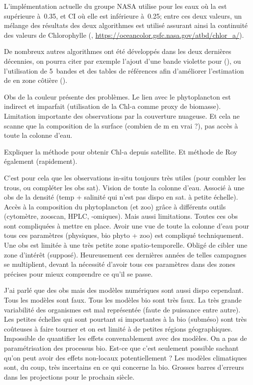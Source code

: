 L'implémentation actuelle du groupe NASA  utilise  pour les eaux où la  est supérieure à~\qty{0.35}{\mgm}, et CI où elle est inférieure à~\qty{0.25}{\mgm}; entre ces deux valeurs, un mélange des résultats des deux algorithmes est utilisé assurant ainsi la continuité des valeurs de Chlorophylle (\cite{oreilly_2019}, \url{https://oceancolor.gsfc.nasa.gov/atbd/chlor_a/}).

De nombreux autres algorithmes ont été développés dans les deux dernières décennies, on pourra citer par exemple l'ajout d'une bande violette pour  (\cite{oreilly_2019}), ou l'utilisation de 5~bandes et des tables de références afin d'améliorer l'estimation de  en zone côtière (\cite{gohin_2002}).

Obs de la couleur présente des problèmes. Le lien avec le phytoplancton est indirect et imparfait (utilisation de la Chl-a comme proxy de biomasse). Limitation importante des observations par la couverture nuageuse. Et cela ne scanne que la composition de la surface (combien de m en vrai ?), pas accès à toute la colonne d'eau.

Expliquer la méthode pour obtenir Chl-a depuis satellite. Et méthode de Roy également (rapidement).

C'est pour cela que les observations in-situ toujours très utiles (pour combler les trous, ou compléter les obs sat). Vision de toute la colonne d'eau. Associé à une obs de la densité (temp + salinité qui n'est pas dispo en sat. à petite échelle).
Accès à la composition du phytoplancton (et zoo) grâce à différents outils (cytomètre, zooscan, HPLC, -omiques).
Mais aussi limitations. Toutes ces obs sont compliquées à mettre en place. Avoir une vue de toute la colonne d'eau pour tous ces paramètres (physiques, bio phyto + zoo) est compliqué techniquement. Une obs est limitée à une très petite zone spatio-temporelle. Obligé de cibler une zone d'intérêt (supposé).
Heureusement ces dernières années de telles campagnes se multiplient, devant la nécessité d'avoir tous ces paramètres dans des zones précises pour mieux comprendre ce qu'il se passe.

J'ai parlé que des obs mais des modèles numériques sont aussi dispo cependant.
Tous les modèles sont faux. Tous les modèles bio sont très faux.
La très grande variabilité des organismes est mal représentée (faute de puissance entre autre). Les petites échelles qui sont pourtant si importantes à la bio (subméso) sont très coûteuses à faire tourner et on est limité à de petites régions géographiques. Impossible de quantifier les effets convenablement avec des modèles.
On a pas de paramétrisation des processus bio. Est-ce que c'est seulement possible sachant qu'on peut avoir des effets non-locaux potentiellement ?
Les modèles climatiques sont, du coup, très incertains en ce qui concerne la bio.
Grosses barres d'erreurs dans les projections pour le prochain siècle.

